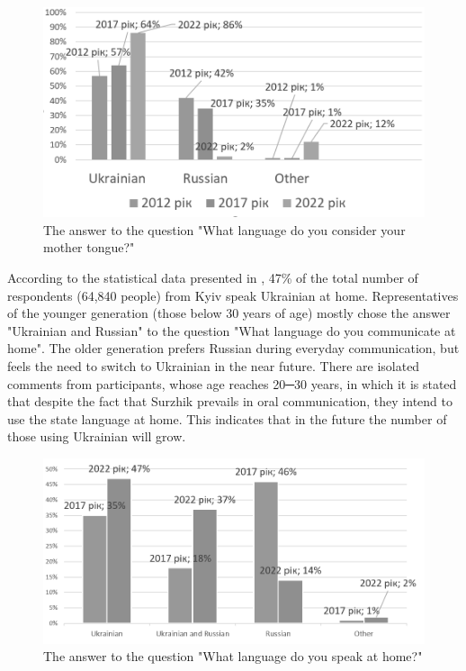 \documentclass[english]{textolivre}
\begin{document}
\begin{figure}[h!]
\centering
\begin{minipage}{.7\textwidth}
 \includegraphics[width=\textwidth]{Fig2.png}
 \caption{The answer to the question "What language do you consider your mother tongue?"}
 \label{fig2}
\end{minipage}
\end{figure}

According to the statistical data presented in , 47\% of the total number of respondents (64,840 people) from Kyiv speak Ukrainian at home. Representatives of the younger generation (those below 30 years of age) mostly chose the answer "Ukrainian and Russian" to the question "What language do you communicate at home". The older generation prefers Russian during everyday communication, but feels the need to switch to Ukrainian in the near future. There are isolated comments from participants, whose age reaches 20─30 years, in which it is stated that despite the fact that Surzhik prevails in oral communication, they intend to use the state language at home. This indicates that in the future the number of those using Ukrainian will grow.

\begin{figure}[h!]
\centering
\begin{minipage}{.7\textwidth}
 \includegraphics[width=\textwidth]{Fig3.png}
 \caption{The answer to the question "What language do you speak at home?"}
 \label{fig3}
\end{minipage}
\end{figure}
\end{document}
